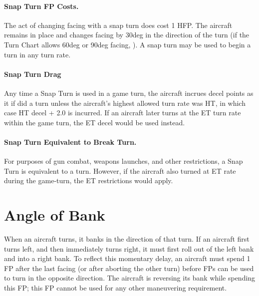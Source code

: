 {\paragraph{Snap Turn FP Costs.} The act of changing facing with a snap turn does cost 1 HFP.  The aircraft remains in place and changes facing by 30{deg} in the direction of the turn (if the Turn Chart allows 60{deg} or 90{deg} facing, ). A snap turn may be used to begin a turn in any turn rate.

\paragraph{Snap Turn Drag} Any time a Snap Turn is used in a game turn, the aircraft incrues decel points as it if did a  turn unless the aircraft's highest allowed turn rate was HT, in which case HT decel + 2.0 is incurred. If an aircraft later turns at the ET turn rate within the game turn, the ET decel would be used instead.

\paragraph{Snap Turn Equivalent to Break Turn.} For purposes of gun combat, weapons launches, and other restrictions, a Snap Turn is equivalent to a  turn. However, if the aircraft also turned at ET rate during the game-turn, the ET restrictions would apply.
}

\section{Angle of Bank}

When an aircraft turns, it banks in the direction of that turn.  If an aircraft first turns left, and then immediately turns right, it must first roll out of the left bank and into a right bank. To reflect this momentary delay, an aircraft must spend 1 FP after the last facing (or after aborting the other turn) before FPs can be used to turn in the opposite direction. The aircraft is reversing its bank while spending this FP; this FP cannot be used for any other maneuvering requirement.

